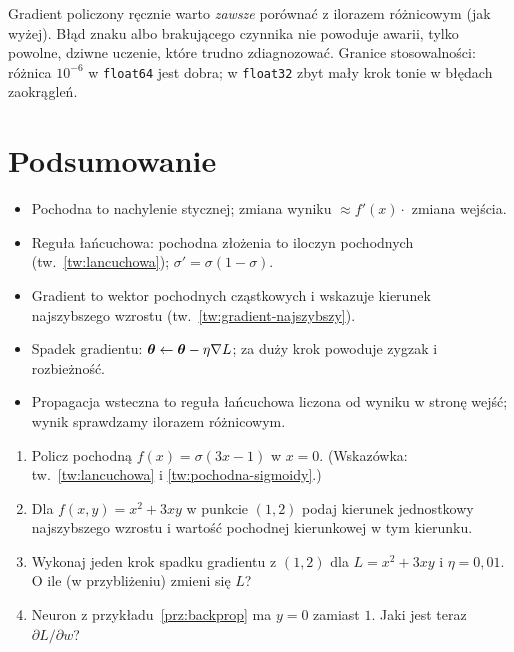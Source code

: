\begin{pulapka}
Gradient policzony ręcznie warto \emph{zawsze} porównać z ilorazem różnicowym (jak wyżej). Błąd znaku albo brakującego czynnika
nie powoduje awarii, tylko powolne, dziwne uczenie, które trudno zdiagnozować. Granice stosowalności: różnica $10^{-6}$ w
\texttt{float64} jest dobra; w \texttt{float32} zbyt mały krok tonie w błędach zaokrągleń.
\end{pulapka}

\section*{Podsumowanie}
\begin{itemize}
\item Pochodna to nachylenie stycznej; zmiana wyniku $\approx f'(x)\cdot$ zmiana wejścia.
\item Reguła łańcuchowa: pochodna złożenia to iloczyn pochodnych (tw.~\ref{tw:lancuchowa}); $\sigma'=\sigma(1-\sigma)$.
\item Gradient to wektor pochodnych cząstkowych i wskazuje kierunek najszybszego wzrostu (tw.~\ref{tw:gradient-najszybszy}).
\item Spadek gradientu: $\bm{\theta}\leftarrow\bm{\theta}-\eta\nabla L$; za duży krok powoduje zygzak i rozbieżność.
\item Propagacja wsteczna to reguła łańcuchowa liczona od wyniku w stronę wejść; wynik sprawdzamy ilorazem różnicowym.
\end{itemize}

\begin{sprawdz}
\begin{enumerate}
\item Policz pochodną $f(x)=\sigma(3x-1)$ w $x=0$. (Wskazówka: tw.~\ref{tw:lancuchowa} i \ref{tw:pochodna-sigmoidy}.)
\item Dla $f(x,y)=x^2+3xy$ w punkcie $(1,2)$ podaj kierunek jednostkowy najszybszego wzrostu i wartość pochodnej kierunkowej w tym kierunku.
\item Wykonaj jeden krok spadku gradientu z $(1,2)$ dla $L=x^2+3xy$ i $\eta=0{,}01$. O ile (w przybliżeniu) zmieni się $L$?
\item Neuron z przykładu~\ref{prz:backprop} ma $y=0$ zamiast $1$. Jaki jest teraz $\partial L/\partial w$?
\end{enumerate}
\end{sprawdz}

